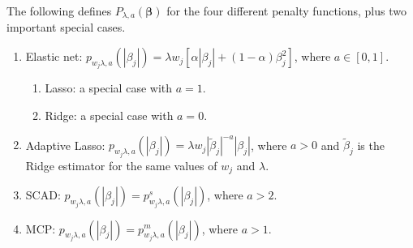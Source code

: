 The following defines \(P_{\lambda,a}(\boldsymbol \beta)\) for the four different penalty functions, plus two important special cases.

\begin{enumerate}
\item Elastic net: $p_{w_j\lambda,a}(|\beta_j|) = \lambda w_j \left[ \alpha |\beta_j| +  (1-\alpha) \beta_j^2 \right]$, where $a \in [0,1]$.
\begin{enumerate}
\item Lasso: a special case with $a=1$.
\item Ridge: a special case with $a=0$.
\end{enumerate}
\item Adaptive Lasso: $p_{w_j\lambda,a}(|\beta_j|) = \lambda w_j |\tilde{\beta}_j|^{-a} |\beta_j|$, where $a>0$ and $\tilde{\beta}_j$ is the Ridge estimator for the same values of $w_j$ and $\lambda$.
\item SCAD: $p_{w_j\lambda,a}(|\beta_j|) =  p^s_{w_j\lambda,a}(|\beta_j|)$, where $a>2$.
\item MCP: $p_{w_j\lambda,a}(|\beta_j|) = p^m_{w_j\lambda,a}(|\beta_j|)$, where $a>1$.
\end{enumerate}

